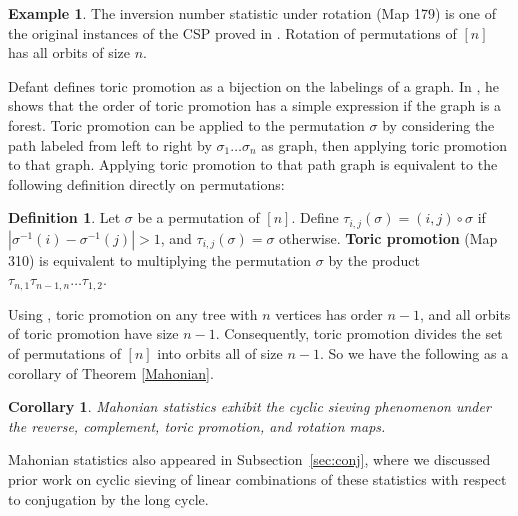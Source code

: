 \documentclass{amsart}
\newtheorem{cor}[thm]{Corollary}
\theoremstyle{definition}
\newtheorem{definition}[thm]{Definition}
\newtheorem{example}[thm]{Example}
\begin{document}

\begin{example}
The inversion number statistic under rotation (Map 179) is one of the original instances of the CSP proved in \cite[Theorem 1.1]{ReStWh2004}. Rotation of permutations of $[n]$ has all orbits of size $n$. 
\end{example}

Defant defines {toric promotion} as a bijection on the labelings of a graph. In \cite{ToricPromotion}, he shows that the order of toric promotion has a simple expression if the graph is a forest. Toric promotion can be applied to the permutation $\sigma$ by considering the path labeled from left to right by $\sigma_1\ldots \sigma_n$ as graph, then applying toric promotion to that graph.
Applying toric promotion to that path graph is equivalent to the following definition directly on permutations:
\begin{definition}
\label{def:toric}
Let $\sigma$ be a permutation of $[n]$. Define $\tau_{i,j}(\sigma)= (i,j) \circ \sigma$ if $|\sigma^{-1}(i)-\sigma^{-1}(j)| >1$, and $\tau_{i,j}(\sigma) = \sigma$ otherwise. \textbf{Toric promotion} (Map 310) is equivalent to multiplying the permutation $\sigma$ by the product $\tau_{n,1}\tau_{n-1,n}\ldots\tau_{1,2}$.
\end{definition}

Using \cite[Theorem 1.3]{ToricPromotion}, toric promotion on any tree with $n$ vertices has order $n-1$, and all orbits of toric promotion have size $n-1$. Consequently, toric promotion divides the set of permutations of $[n]$ into orbits all of size $n-1$. So we have the following as a corollary of Theorem \ref{Mahonian}. 

\begin{cor}\label{Mahonian_cor}
   Mahonian statistics exhibit the cyclic sieving phenomenon under the reverse, complement, toric promotion, and rotation maps.
\end{cor}

Mahonian statistics  also appeared in Subsection~\ref{sec:conj}, where we discussed prior work on cyclic sieving of linear combinations of these statistics with respect to conjugation by the long cycle.
\end{document}
